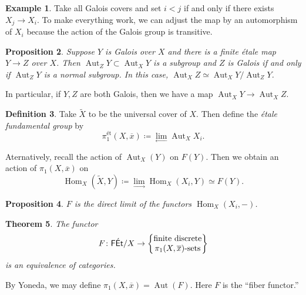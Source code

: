 \documentclass[leqno, openany]{memoir}
\newtheorem{thm}{Theorem}[section]
\newtheorem{prop}[thm]{Proposition}
\theoremstyle{definition}
\newtheorem{defn}[thm]{Definition}
\newtheorem{exm}[thm]{Example}
\theoremstyle{remark}
\theoremstyle{plain}
\theoremstyle{definition}
\theoremstyle{remark}
\newcommand{\ms}[1]{\mathsf{#1}}
\newcommand{\ol}[1]{\overline{#1}}
\newcommand{\wt}[1]{\widetilde{#1}}
\DeclareMathOperator{\Hom}{Hom}
\DeclareMathOperator{\Aut}{Aut}
\begin{document}
\begin{exm} Take all Galois covers and set $i < j$ if and only if there exists
$X_j \to X_i$. To make everything work, we can adjust the map by an
automorphism of $X_i$ because the action of the Galois group is transitive.
\end{exm}

\begin{prop} Suppose $Y$ is Galois over $X$ and there is a finite \'etale map
    $Y \to Z$ over $X$. Then $\Aut_Z Y \subset \Aut_X Y$ is a subgroup and $Z$
    is Galois if and only if $\Aut_Z Y$ is a normal subgroup. In this case,
    $\Aut_X Z \simeq \Aut_X Y / \Aut_Z Y$.  \end{prop}

In particular, if $Y,Z$ are both Galois, then we have a map $\Aut_X Y \to
\Aut_X Z$.

\begin{defn} Take $\wt{X}$ to be the universal cover of $X$. Then define the
    \textit{\'etale fundamental group} by \[ \pi_1^{\text{\'et}}(X,\ol{x})
    \coloneqq \lim_{\longleftarrow} \Aut_X X_i. \] \end{defn}

Aternatively, recall the action of $\Aut_X(Y)$ on $F(Y)$. Then we obtain an
action of $\pi_1(X, \ol{x})$ on \[ \Hom_X(\wt{X}, Y) \coloneqq
\lim_{\longrightarrow} \Hom_X(X_i, Y) \simeq F(Y). \]

\begin{prop} $F$ is the direct limit of the functors $\Hom_X(X_i, -)$.
\end{prop}

\begin{thm} The functor \[ F \colon \ms{F\acute{E}t}/X \to \qty{
\Centerstack{{finite discrete} {$\pi_1(X,\ol{x})$-sets}}} \] is an equivalence
of categories.  \end{thm}

By Yoneda, we may define $\pi_1(X,\ol{x}) = \Aut(F)$. Here $F$ is the ``fiber
functor.''
\end{document}
